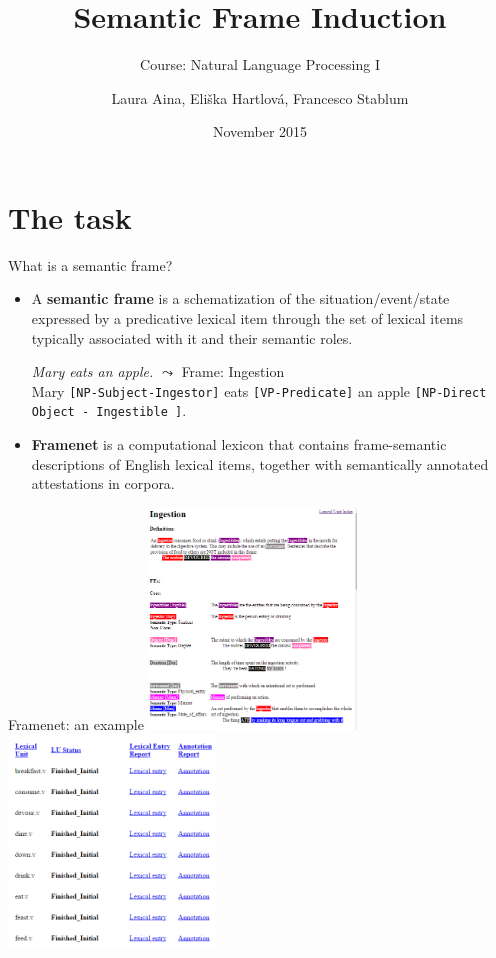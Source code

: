 \documentclass[xcolor=svgnames,handout]{beamer}
\title{Semantic Frame Induction}
\subtitle {Course: Natural Language Processing I}
\author{Laura Aina, Eliška Hartlová, Francesco Stablum}
\institute[University of Amsterdam] %
\date{November \nth{13} 2015}
\begin{document}
 

\begin{frame}
  \titlepage
\end{frame}

\section{The task}

\begin{frame}{What is a semantic frame?}
  \begin{itemize}
  \item {
    A \textbf{semantic frame} is a schematization of the situation/event/state expressed by a predicative lexical item through the set of lexical items typically associated with it and their semantic roles.
    \begin {example}
    \textit{Mary eats an apple.} $\leadsto$ {Frame: Ingestion} \\ Mary \texttt{[NP-Subject-Ingestor]} eats \texttt{[VP-Predicate]} an apple \texttt{[NP-Direct Object - Ingestible ]}. 
    \end{example}
    \pause
  }
  \item {
    \textbf{Framenet} is a computational lexicon that contains frame-semantic descriptions of English lexical items, together with semantically annotated attestations in corpora.
  }
  \end{itemize}
\end{frame}

\begin{frame}{Framenet: an example}
\includegraphics[width=55mm]{framenet1}
\includegraphics[width=55mm]{framenet2}
\end{frame}
\end{document}
